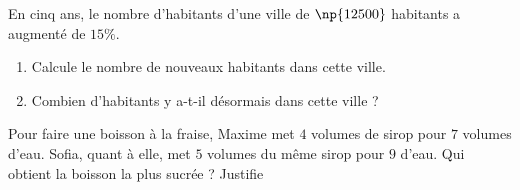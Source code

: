 \documentclass[a4paper,10pt]{report}
\begin{document}
\begin{ex}
En cinq ans, le nombre d'habitants d'une ville de $\np{12 500}$ habitants a augmenté de $15\%$.
\begin{enumerate}
\item Calcule le nombre de nouveaux habitants dans cette ville.
\item Combien d'habitants y a-t-il désormais dans cette ville ?
\end{enumerate}
\end{ex}

\begin{ex}
Pour faire une boisson à la fraise, Maxime met $4$ volumes de sirop pour $7$ volumes d'eau. Sofia, quant à elle, met $5$ volumes du même sirop pour $9$ d'eau. Qui obtient la boisson la plus sucrée ? Justifie
\end{ex}
\end{document}
